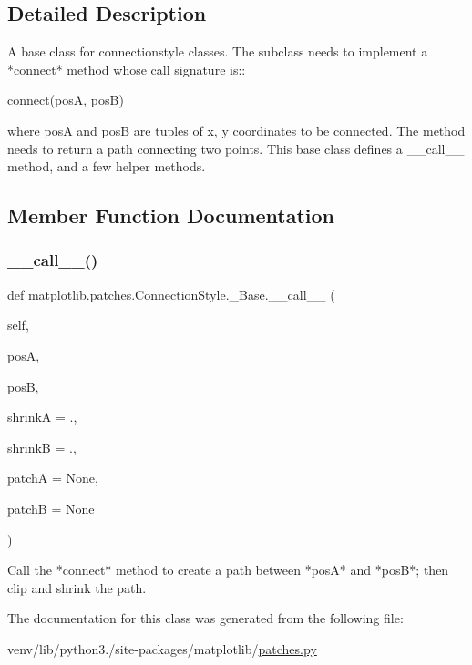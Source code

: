 \subsection{Detailed Description}
\begin{DoxyVerb}A base class for connectionstyle classes. The subclass needs
to implement a *connect* method whose call signature is::

  connect(posA, posB)

where posA and posB are tuples of x, y coordinates to be
connected.  The method needs to return a path connecting two
points. This base class defines a __call__ method, and a few
helper methods.
\end{DoxyVerb}
 

\subsection{Member Function Documentation}
\mbox{\label{classmatplotlib_1_1patches_1_1ConnectionStyle_1_1__Base_ad7d3bfb980597e9c0a651c28549f7a82}} 
\subsubsection{\texorpdfstring{\+\_\+\+\_\+call\+\_\+\+\_\+()}{\_\_call\_\_()}}
{\footnotesize\ttfamily def matplotlib.\+patches.\+Connection\+Style.\+\_\+\+Base.\+\_\+\+\_\+call\+\_\+\+\_\+ (\begin{DoxyParamCaption}\item[{}]{self,  }\item[{}]{posA,  }\item[{}]{posB,  }\item[{}]{shrinkA = {.},  }\item[{}]{shrinkB = {.},  }\item[{}]{patchA = {\ttfamily None},  }\item[{}]{patchB = {\ttfamily None} }\end{DoxyParamCaption})}

\begin{DoxyVerb}Call the *connect* method to create a path between *posA* and
*posB*; then clip and shrink the path.
\end{DoxyVerb}
 

The documentation for this class was generated from the following file\+:\begin{DoxyCompactItemize}
\item 
venv/lib/python3./site-\/packages/matplotlib/\hyperlink{patches_8py}{patches.\+py}\end{DoxyCompactItemize}
